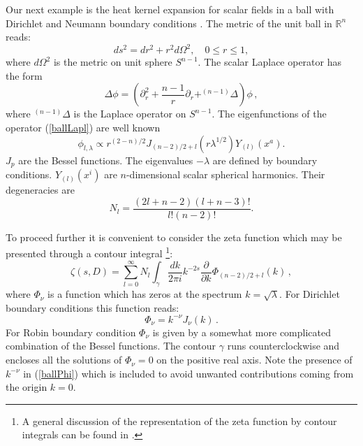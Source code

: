 Our next example is the heat kernel expansion for scalar fields in
a ball with Dirichlet and Neumann boundary conditions
\cite{Stewartson:1971,Waechter:1972,Kennedy:1978jp,Moss:1989yf,Bordag:1996gm}.
The metric of the unit ball in $\mathbb{R}^n$ reads:
\begin{equation}
ds^2=dr^2+r^2 d\Omega^2, \quad 0\le r \le 1 , \label{ballmetric}
\end{equation}
where $d\Omega^2$ is the metric on unit sphere $S^{n-1}$.
The scalar Laplace operator has the form
\begin{equation}
\Delta \phi =
\left( \partial^2_r+\frac {n-1}r \partial_r+^{(n-1)}\Delta 
\right) \phi \,,
\label{ballLapl}
\end{equation}
where $^{(n-1)}\Delta$ is the Laplace operator on $S^{n-1}$.
The eigenfunctions
of the operator (\ref{ballLapl}) are well known
\begin{equation}
\phi_{l,\lambda }\propto r^{(2-n)/2 } J_{(n-2)/2 +l}
(r\lambda^{1/2} ) Y_{(l)}(x^a). \label{balleigenf}
\end{equation}
$J_p$ are the Bessel functions. The eigenvalues $-\lambda$
are defined by boundary conditions. $Y_{(l)}(x^i)$ are
$n$-dimensional scalar spherical harmonics. Their degeneracies
are
\begin{equation}
N_l=\frac {(2l+n-2)(l+n-3)!}{l!(n-2)!} . \label{spherdeg}
\end{equation}

To proceed further it is convenient to consider the zeta function
which may be presented through a contour integral 
\cite{Bordag:1996gm}\footnote{A general discussion of the representation
of the zeta function by contour integrals can be found in 
\cite{Kirsten:2003py}.}:
\begin{equation}
\zeta (s,D)=\sum_{l=0}^\infty N_l \int_\gamma
\frac{dk}{2\pi i} k^{-2s} \frac{\partial}{\partial k}
\Phi_{(n-2)/2 +l} (k) \,,\label{ballzeta}
\end{equation}
where $\Phi_\nu$ is a function which has zeros at the spectrum
$k=\sqrt\lambda$.
For Dirichlet boundary conditions this function reads:
\begin{equation}
\Phi_\nu =k^{-\nu} J_\nu (k) \,.\label{ballPhi}
\end{equation}
For Robin boundary condition $\Phi_\nu$ is given by a somewhat
more complicated combination of the Bessel functions. The contour 
$\gamma$ runs counterclockwise and encloses all the solutions
of  $\Phi_\nu =0$ on the positive real axis. Note the presence 
of $k^{-\nu}$ in (\ref{ballPhi}) which is included to avoid unwanted
contributions coming from the origin $k=0$.

